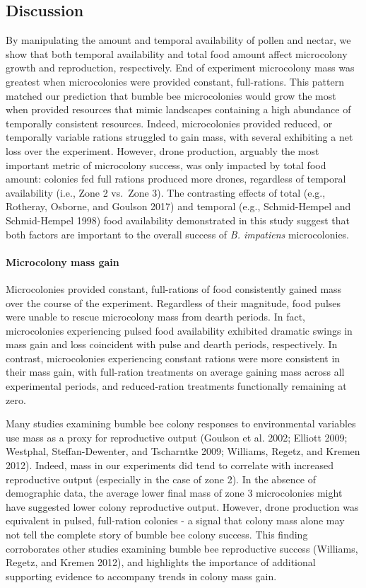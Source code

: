 \documentclass[11pt,]{article}
\let\oldparagraph\paragraph
\renewcommand{\paragraph}[1]{\oldparagraph{#1}\mbox{}}
\begin{document}
\hypertarget{discussion}{%
\subsection{Discussion}\label{discussion}}

By manipulating the amount and temporal availability of pollen and
nectar, we show that both temporal availability and total food amount
affect microcolony growth and reproduction, respectively. End of
experiment microcolony mass was greatest when microcolonies were
provided constant, full-rations. This pattern matched our prediction
that bumble bee microcolonies would grow the most when provided
resources that mimic landscapes containing a high abundance of
temporally consistent resources. Indeed, microcolonies provided reduced,
or temporally variable rations struggled to gain mass, with several
exhibiting a net loss over the experiment. However, drone production,
arguably the most important metric of microcolony success, was only
impacted by total food amount: colonies fed full rations produced more
drones, regardless of temporal availability (i.e., Zone 2 vs.~Zone 3).
The contrasting effects of total (e.g., Rotheray, Osborne, and Goulson
2017) and temporal (e.g., Schmid-Hempel and Schmid-Hempel 1998) food
availability demonstrated in this study suggest that both factors are
important to the overall success of \emph{B. impatiens} microcolonies.

\hypertarget{microcolony-mass-gain}{%
\paragraph{Microcolony mass gain}\label{microcolony-mass-gain}}

Microcolonies provided constant, full-rations of food consistently
gained mass over the course of the experiment. Regardless of their
magnitude, food pulses were unable to rescue microcolony mass from
dearth periods. In fact, microcolonies experiencing pulsed food
availability exhibited dramatic swings in mass gain and loss coincident
with pulse and dearth periods, respectively. In contrast, microcolonies
experiencing constant rations were more consistent in their mass gain,
with full-ration treatments on average gaining mass across all
experimental periods, and reduced-ration treatments functionally
remaining at zero.

Many studies examining bumble bee colony responses to environmental
variables use mass as a proxy for reproductive output (Goulson et al.
2002; Elliott 2009; Westphal, Steffan-Dewenter, and Tscharntke 2009;
Williams, Regetz, and Kremen 2012). Indeed, mass in our experiments did
tend to correlate with increased reproductive output (especially in the
case of zone 2). In the absence of demographic data, the average lower
final mass of zone 3 microcolonies might have suggested lower colony
reproductive output. However, drone production was equivalent in pulsed,
full-ration colonies - a signal that colony mass alone may not tell the
complete story of bumble bee colony success. This finding corroborates
other studies examining bumble bee reproductive success (Williams,
Regetz, and Kremen 2012), and highlights the importance of additional
supporting evidence to accompany trends in colony mass gain.
\end{document}
